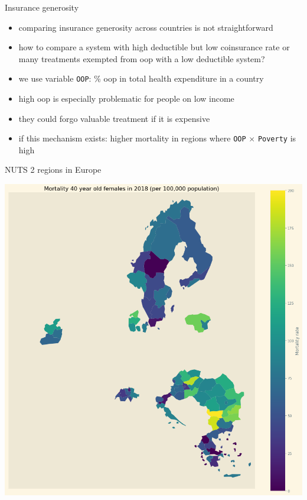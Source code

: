 \documentclass[presentation]{beamer}
\begin{document}
\begin{frame}[label={sec:org448556f},fragile]{Insurance generosity}
 \begin{itemize}
\item comparing insurance generosity across countries is not straightforward
\item how to compare a system with high deductible but low coinsurance rate or many treatments exempted from oop with a low deductible system?
\item we use variable \texttt{OOP}: \% oop in total health expenditure in a country
\item high oop is especially problematic for people on low income
\item they could forgo valuable treatment if it is expensive
\item if this mechanism exists: higher mortality in regions where \texttt{OOP} \(\times\) \texttt{Poverty} is high
\end{itemize}
\end{frame}

\begin{frame}[label={sec:org160bd53}]{NUTS 2 regions in Europe}
\begin{center}
\includegraphics[width=.6\linewidth]{./figures/Europe_mortality_40_F_2018.png}
\label{fig:EUmap}
\end{center}
\end{frame}
\end{document}

